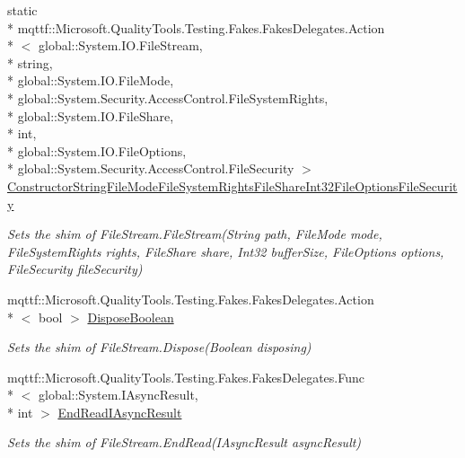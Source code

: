 \begin{DoxyCompactItemize}
static \\*
mqttf\-::\-Microsoft.\-Quality\-Tools.\-Testing.\-Fakes.\-Fakes\-Delegates.\-Action\\*
$<$ global\-::\-System.\-I\-O.\-File\-Stream, \\*
string, \\*
global\-::\-System.\-I\-O.\-File\-Mode, \\*
global\-::\-System.\-Security.\-Access\-Control.\-File\-System\-Rights, \\*
global\-::\-System.\-I\-O.\-File\-Share, \\*
int, \\*
global\-::\-System.\-I\-O.\-File\-Options, \\*
global\-::\-System.\-Security.\-Access\-Control.\-File\-Security $>$ \hyperlink{class_system_1_1_i_o_1_1_fakes_1_1_shim_file_stream_aa324bd3dff3df7409a7b1547113689b0}{Constructor\-String\-File\-Mode\-File\-System\-Rights\-File\-Share\-Int32\-File\-Options\-File\-Security}
\begin{DoxyCompactList}\small\item\em Sets the shim of File\-Stream.\-File\-Stream(\-String path, File\-Mode mode, File\-System\-Rights rights, File\-Share share, Int32 buffer\-Size, File\-Options options, File\-Security file\-Security)\end{DoxyCompactList}\item 
mqttf\-::\-Microsoft.\-Quality\-Tools.\-Testing.\-Fakes.\-Fakes\-Delegates.\-Action\\*
$<$ bool $>$ \hyperlink{class_system_1_1_i_o_1_1_fakes_1_1_shim_file_stream_a33330a39caa1498ce10e0e8f922e918a}{Dispose\-Boolean}
\begin{DoxyCompactList}\small\item\em Sets the shim of File\-Stream.\-Dispose(\-Boolean disposing)\end{DoxyCompactList}\item 
mqttf\-::\-Microsoft.\-Quality\-Tools.\-Testing.\-Fakes.\-Fakes\-Delegates.\-Func\\*
$<$ global\-::\-System.\-I\-Async\-Result, \\*
int $>$ \hyperlink{class_system_1_1_i_o_1_1_fakes_1_1_shim_file_stream_a881a8f04684948bb2071c50fabf15886}{End\-Read\-I\-Async\-Result}
\begin{DoxyCompactList}\small\item\em Sets the shim of File\-Stream.\-End\-Read(\-I\-Async\-Result async\-Result)\end{DoxyCompactList}\item 

\end{DoxyCompactItemize}
